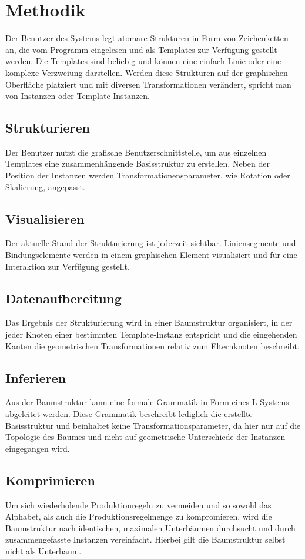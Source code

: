 \section{Methodik}
Der Benutzer des Systems legt atomare Strukturen in Form von Zeichenketten an, die vom Programm eingelesen und
als Templates zur Verfügung gestellt werden.
Die Templates sind beliebig und können eine einfach Linie oder eine komplexe Verzweiung darstellen.
Werden diese Strukturen auf der graphischen Oberfläche platziert und mit diversen Transformationen verändert, spricht man
von Instanzen oder Template-Instanzen.

\subsection*{Strukturieren}
Der Benutzer nutzt die grafische Benutzerschnittstelle, um aus einzelnen Templates eine zusammenhängende Basisstruktur zu
erstellen.
Neben der Position der Instanzen werden Transformationensparameter, wie Rotation oder Skalierung, angepasst.

\subsection*{Visualisieren}
Der aktuelle Stand der Strukturierung ist jederzeit sichtbar.
Liniensegmente und Bindungselemente werden in einem graphischen Element visualisiert und für eine Interaktion zur Verfügung
gestellt.

\subsection*{Datenaufbereitung}
Das Ergebnis der Strukturierung wird in einer Baumstruktur
organisiert, in der jeder Knoten einer bestimmten Template-Instanz entspricht und die eingehenden Kanten die
geometrischen Transformationen relativ zum Elternknoten beschreibt.

\subsection*{Inferieren}
Aus der Baumstruktur kann eine formale Grammatik in Form eines L-Systems abgeleitet werden.
Diese Grammatik beschreibt lediglich die erstellte Basisstruktur und beinhaltet keine Transformationsparameter, da hier
nur auf die Topologie des Baumes und nicht auf geometrische Unterschiede der Instanzen eingegangen wird.

\subsection*{Komprimieren}
Um sich wiederholende Produktionregeln zu vermeiden und so sowohl das Alphabet, als auch die Produktionsregelmenge
zu kompromieren, wird die Baumstruktur nach identischen, maximalen Unterbäumen durchsucht und durch zusammengefasste
Instanzen vereinfacht.
Hierbei gilt die Baumstruktur selbst nicht als Unterbaum.

